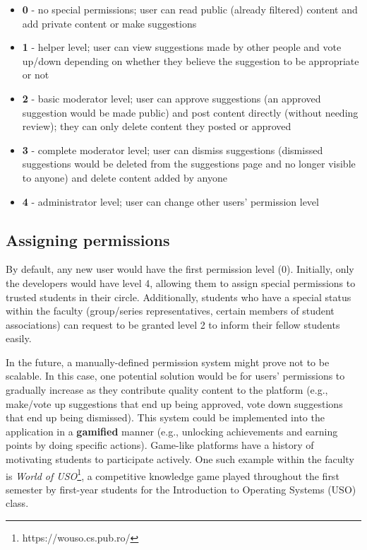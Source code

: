 \begin{itemize}
    \setlength{\topsep}{0.5pt}
    \setlength{\itemsep}{0.5pt}
    \setlength{\parsep}{0.5pt}
    \item \textbf{0} - no special permissions; user can read public (already filtered) content and add private content or make suggestions
    \item \textbf{1} - helper level; user can view suggestions made by other people and vote up/down depending on whether they believe the suggestion to be appropriate or not
    \item \textbf{2} - basic moderator level; user can approve suggestions (an approved suggestion would be made public) and post content directly (without needing review); they can only delete content they posted or approved
    \item \textbf{3} - complete moderator level; user can dismiss suggestions (dismissed suggestions would be deleted from the suggestions page and no longer visible to anyone) and delete content added by anyone
    \item \textbf{4} - administrator level; user can change other users' permission level
\end{itemize}

\subsection{Assigning permissions} \label{4:permissions_assigning}

By default, any new user would have the first permission level (0). Initially, only the developers would have level 4, allowing them to assign special permissions to trusted students in their circle. Additionally, students who have a special status within the faculty (group/series representatives, certain members of student associations) can request to be granted level 2 to inform their fellow students easily.

In the future, a manually-defined permission system might prove not to be scalable. In this case, one potential solution would be for users' permissions to gradually increase as they contribute quality content to the platform (e.g., make/vote up suggestions that end up being approved, vote down suggestions that end up being dismissed). This system could be implemented into the application in a \textbf{gamified} manner (e.g., unlocking achievements and earning points by doing specific actions). Game-like platforms have a history of motivating students to participate actively. One such example within the faculty is \textit{World of USO}\footnote{https://wouso.cs.pub.ro/}, a competitive knowledge game played throughout the first semester by first-year students for the Introduction to Operating Systems (USO) class.

